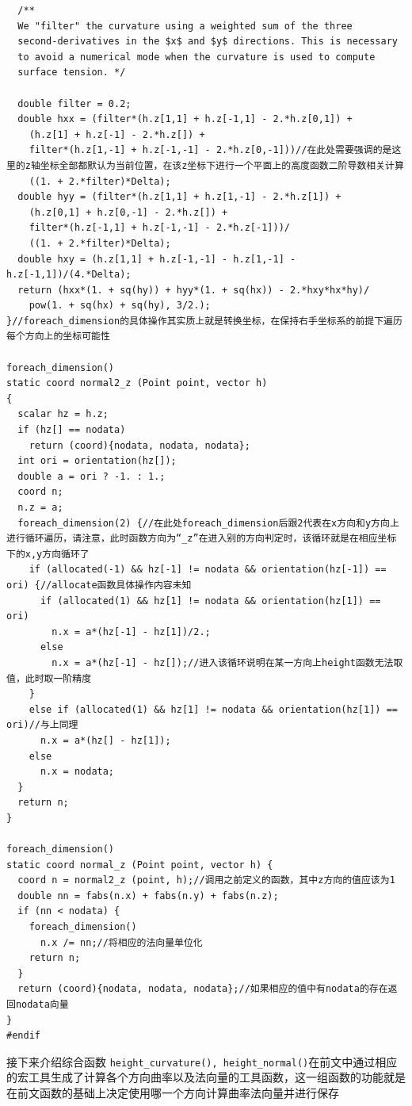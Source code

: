 \documentclass[lang=cn,11pt,a4paper]{elegantpaper}
\begin{document}
\begin{verbatim}
  /**
  We "filter" the curvature using a weighted sum of the three
  second-derivatives in the $x$ and $y$ directions. This is necessary
  to avoid a numerical mode when the curvature is used to compute
  surface tension. */
  
  double filter = 0.2;
  double hxx = (filter*(h.z[1,1] + h.z[-1,1] - 2.*h.z[0,1]) +
    (h.z[1] + h.z[-1] - 2.*h.z[]) +
    filter*(h.z[1,-1] + h.z[-1,-1] - 2.*h.z[0,-1]))//在此处需要强调的是这里的z轴坐标全部都默认为当前位置，在该z坐标下进行一个平面上的高度函数二阶导数相关计算
    ((1. + 2.*filter)*Delta);
  double hyy = (filter*(h.z[1,1] + h.z[1,-1] - 2.*h.z[1]) +
    (h.z[0,1] + h.z[0,-1] - 2.*h.z[]) +
    filter*(h.z[-1,1] + h.z[-1,-1] - 2.*h.z[-1]))/
    ((1. + 2.*filter)*Delta);
  double hxy = (h.z[1,1] + h.z[-1,-1] - h.z[1,-1] - h.z[-1,1])/(4.*Delta);
  return (hxx*(1. + sq(hy)) + hyy*(1. + sq(hx)) - 2.*hxy*hx*hy)/
    pow(1. + sq(hx) + sq(hy), 3/2.);
}//foreach_dimension的具体操作其实质上就是转换坐标，在保持右手坐标系的前提下遍历每个方向上的坐标可能性

foreach_dimension()
static coord normal2_z (Point point, vector h)
{
  scalar hz = h.z;
  if (hz[] == nodata)
    return (coord){nodata, nodata, nodata};
  int ori = orientation(hz[]);
  double a = ori ? -1. : 1.;
  coord n;
  n.z = a;
  foreach_dimension(2) {//在此处foreach_dimension后跟2代表在x方向和y方向上进行循环遍历，请注意，此时函数方向为“_z”在进入别的方向判定时，该循环就是在相应坐标下的x,y方向循环了
    if (allocated(-1) && hz[-1] != nodata && orientation(hz[-1]) == ori) {//allocate函数具体操作内容未知
      if (allocated(1) && hz[1] != nodata && orientation(hz[1]) == ori)
        n.x = a*(hz[-1] - hz[1])/2.;
      else
        n.x = a*(hz[-1] - hz[]);//进入该循环说明在某一方向上height函数无法取值，此时取一阶精度
    }
    else if (allocated(1) && hz[1] != nodata && orientation(hz[1]) == ori)//与上同理
      n.x = a*(hz[] - hz[1]);
    else
      n.x = nodata;
  }
  return n;
}

foreach_dimension()
static coord normal_z (Point point, vector h) {
  coord n = normal2_z (point, h);//调用之前定义的函数，其中z方向的值应该为1
  double nn = fabs(n.x) + fabs(n.y) + fabs(n.z);
  if (nn < nodata) {
    foreach_dimension()
      n.x /= nn;//将相应的法向量单位化
    return n;
  }
  return (coord){nodata, nodata, nodata};//如果相应的值中有nodata的存在返回nodata向量
}
#endif
\end{verbatim}
接下来介绍综合函数 \texttt{height_curvature(), height_normal()}在前文中通过相应的宏工具生成了计算各个方向曲率以及法向量的工具函数，这一组函数的功能就是在前文函数的基础上决定使用哪一个方向计算曲率法向量并进行保存 
\end{document}
